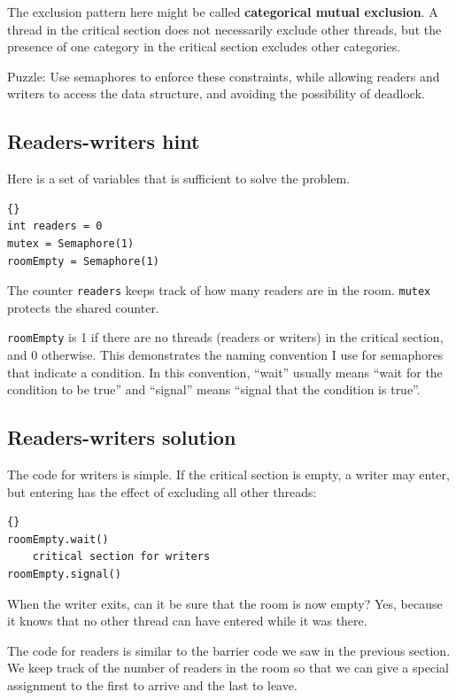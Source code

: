 \documentclass{book}
\newcommand{\clearemptydoublepage}{\newpage\cleardoublepage}
\begin{document}
The exclusion pattern here might be called {\bf categorical
mutual exclusion}.  A thread in the critical section
does not necessarily exclude other threads, but the presence
of one category in the critical section excludes other
categories.

Puzzle: Use semaphores to enforce these constraints, while allowing
readers and writers to access the data structure, and avoiding
the possibility of deadlock.


\clearemptydoublepage
\subsection{Readers-writers hint}

Here is a set of variables that is sufficient to solve the
problem.

\begin{lstlisting}[title={Readers-writers initialization}]{}
int readers = 0
mutex = Semaphore(1)
roomEmpty = Semaphore(1)
\end{lstlisting}

The counter {\tt readers} keeps track of how many readers
are in the room.  {\tt mutex} protects the shared counter.

{\tt roomEmpty} is 1 if there are no threads (readers or writers) in
the critical section, and 0 otherwise.  This demonstrates the naming
convention I use for semaphores that indicate a condition.  In
this convention, ``wait'' usually means ``wait for the condition to
be true'' and ``signal'' means ``signal that the condition is true''.


\clearemptydoublepage
\subsection {Readers-writers solution}

The code for writers is simple.  If the critical section
is empty, a writer may enter, but entering has the effect
of excluding all other threads:

\begin{lstlisting}[title={Writers solution}]{}
roomEmpty.wait()
    critical section for writers
roomEmpty.signal()
\end{lstlisting}

When the writer exits, can it be sure that the room is
now empty?  Yes, because it knows that no other thread can
have entered while it was there.

The code for readers is similar to the barrier code we
saw in the previous section.  We keep track of the number
of readers in the room so that we can give a special assignment
to the first to arrive and the last to leave.
\end{document}
